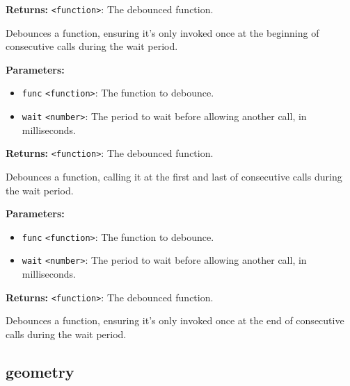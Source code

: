\documentclass[12pt,a4paper]{article}
\begin{document}
\noindent \textbf{Returns:} \texttt{<function>}: The debounced function.

\noindent Debounces a function, ensuring it's only invoked once at the beginning of consecutive calls during the wait period.

\vspace{5mm}
\noindent {}


\noindent \textbf{Parameters:}
\begin{itemize}
  \item \texttt{func} \texttt{<function>}: The function to debounce.
  \item \texttt{wait} \texttt{<number>}: The period to wait before allowing another call, in milliseconds.
\end{itemize}

\noindent \textbf{Returns:} \texttt{<function>}: The debounced function.

\noindent Debounces a function, calling it at the first and last of consecutive calls during the wait period.

\vspace{5mm}
\noindent {}


\noindent \textbf{Parameters:}
\begin{itemize}
  \item \texttt{func} \texttt{<function>}: The function to debounce.
  \item \texttt{wait} \texttt{<number>}: The period to wait before allowing another call, in milliseconds.
\end{itemize}

\noindent \textbf{Returns:} \texttt{<function>}: The debounced function.

\noindent Debounces a function, ensuring it's only invoked once at the end of consecutive calls during the wait period.


\subsection{geometry}
\vspace{5mm}
\noindent {}
\end{document}
